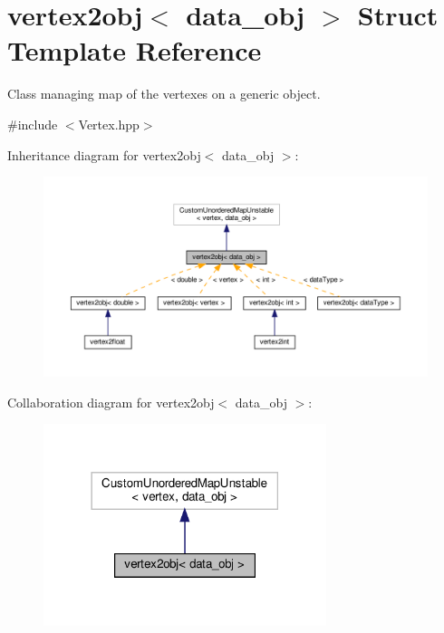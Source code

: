 \hypertarget{structvertex2obj}{}\section{vertex2obj$<$ data\+\_\+obj $>$ Struct Template Reference}
\label{structvertex2obj}


Class managing map of the vertexes on a generic object.  




{\ttfamily \#include $<$Vertex.\+hpp$>$}



Inheritance diagram for vertex2obj$<$ data\+\_\+obj $>$\+:
\nopagebreak
\begin{figure}[H]
\begin{center}
\leavevmode
\includegraphics[width=350pt]{d1/d16/structvertex2obj__inherit__graph}
\end{center}
\end{figure}


Collaboration diagram for vertex2obj$<$ data\+\_\+obj $>$\+:
\nopagebreak
\begin{figure}[H]
\begin{center}
\leavevmode
\includegraphics[width=234pt]{df/d89/structvertex2obj__coll__graph}
\end{center}
\end{figure}
